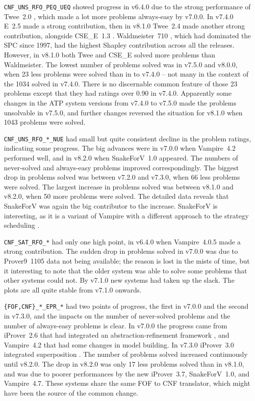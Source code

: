\documentclass[runningheads]{llncs}
\begin{document}
{\tt CNF\_UNS\_RFO\_PEQ\_UEQ} showed progress in v6.4.0 due to the strong performance of
Twee~2.0 \cite{Sma21}, which made a lot more problems always-easy by v7.0.0.
In v7.4.0 E~2.5 made a strong contribution, then in v8.1.0 Twee~2.4 made another strong 
contribution, alongside CSE\_E~1.3 \cite{XL+18}.
Waldmeister~710 \cite{LH02}, which had dominated the SPC since 1997, had the highest Shapley 
contribution across all the releases.
However, in v8.1.0 both Twee and CSE\_E solved more problems than Waldmeister.
The lowest number of problems solved was in v7.5.0 and v8.0.0, when 23 less problems were solved
than in to v7.4.0 -- not many in the context of the 1034 solved in v7.4.0.
There is no discernable common feature of those 23 problems except that they had ratings over
0.90 in v7.4.0.
Apparently some changes in the ATP system versions from v7.4.0 to v7.5.0 made the problems
unsolvable in v7.5.0, and further changes reversed the situation for v8.1.0 when 1043 problems
were solved.
 
{\tt CNF\_UNS\_RFO\_*\_NUE} had small but quite consistent decline in the problem ratings, 
indicating some progress.
The big advances were in v7.0.0 when Vampire~4.2 performed well, and in v8.2.0 when SnakeForV~1.0
appeared.
The numbers of never-solved and always-easy problems improved correspondingly.
The biggest drop in problems solved was between v7.2.0 and v7.3.0, when 66 less problems were
solved.
The largest increase in problems solved was between v8.1.0 and v8.2.0, when 50 more problems
were solved.
The detailed data reveals that SnakeForV was again the big contributor to the increase.
SnakeForV is interesting, as it is a variant of Vampire with a different approach to the strategy
scheduling \cite{Sud22}.

{\tt CNF\_SAT\_RFO\_*} had only one high point, in v6.4.0 when Vampire~4.0.5 made a strong
contribution.
The sudden drop in problems solved in v7.0.0 was due to Prover9~1105 \cite{McC-Prover9-URL}
data not being available; the reason is lost in the mists of time, but it interesting to note 
that the older system was able to solve some problems that other systems could not.
By v7.1.0 new systems had taken up the slack.
The plots are all quite stable from v7.1.0 onwards.

{\tt \{FOF,CNF\}\_*\_EPR\_*} had two points of progress, the first in v7.0.0 and the second in
v7.3.0, and the impacts on the number of never-solved problems and the number of always-easy 
problems is clear.
In v7.0.0 the progress came from iProver~2.6 that had integrated an abstraction-refinement 
framework \cite{HK17}, and Vampire~4.2 that had some changes in model building.
In v7.3.0 iProver~3.0 integrated superposition \cite{DK20}.
The number of problems solved increased continuously until v8.2.0. 
The drop in v8.2.0 was only 17 less problems solved than in v8.1.0, and was due to poorer
performances by the new iProver~3.7, SnakeForV~1.0, and Vampire~4.7.
These systems share the same FOF to CNF translator, which might have been the source of the
common change.
\end{document}
